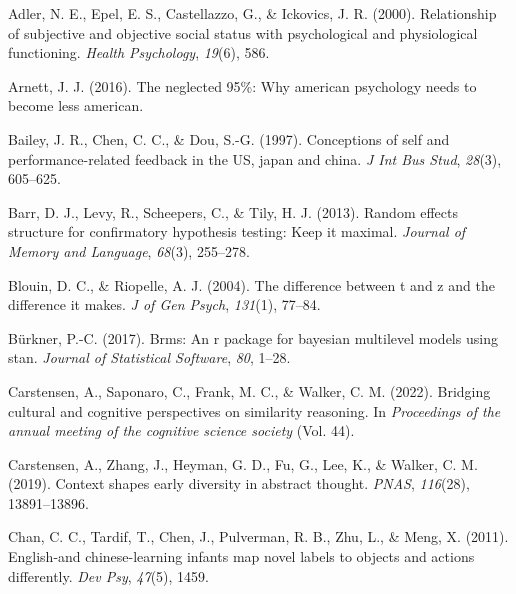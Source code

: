 \documentclass[
  man]{apa6}
\newlength{\cslhangindent}
\newlength{\cslentryspacingunit} %
\newenvironment{CSLReferences}[2] %
 {%
  \setlength{\parindent}{0pt}
  \ifodd #1
  \let\oldpar\par
  \def\par{\hangindent=\cslhangindent\oldpar}
  \fi
  \setlength{\parskip}{#2\cslentryspacingunit}
 }%
 {}
\begin{document}
\hypertarget{refs}{}
\begin{CSLReferences}{1}{0}
\leavevmode{}%
Adler, N. E., Epel, E. S., Castellazzo, G., \& Ickovics, J. R. (2000). Relationship of subjective and objective social status with psychological and physiological functioning. \emph{Health Psychology}, \emph{19}(6), 586.

\leavevmode{}%
Arnett, J. J. (2016). The neglected 95\%: Why american psychology needs to become less american.

\leavevmode{}%
Bailey, J. R., Chen, C. C., \& Dou, S.-G. (1997). Conceptions of self and performance-related feedback in the US, japan and china. \emph{J Int Bus Stud}, \emph{28}(3), 605--625.

\leavevmode{}%
Barr, D. J., Levy, R., Scheepers, C., \& Tily, H. J. (2013). Random effects structure for confirmatory hypothesis testing: Keep it maximal. \emph{Journal of Memory and Language}, \emph{68}(3), 255--278.

\leavevmode{}%
Blouin, D. C., \& Riopelle, A. J. (2004). The difference between t and z and the difference it makes. \emph{J of Gen Psych}, \emph{131}(1), 77--84.

\leavevmode{}%
Bürkner, P.-C. (2017). Brms: An r package for bayesian multilevel models using stan. \emph{Journal of Statistical Software}, \emph{80}, 1--28.

\leavevmode{}%
Carstensen, A., Saponaro, C., Frank, M. C., \& Walker, C. M. (2022). Bridging cultural and cognitive perspectives on similarity reasoning. In \emph{Proceedings of the annual meeting of the cognitive science society} (Vol. 44).

\leavevmode{}%
Carstensen, A., Zhang, J., Heyman, G. D., Fu, G., Lee, K., \& Walker, C. M. (2019). Context shapes early diversity in abstract thought. \emph{PNAS}, \emph{116}(28), 13891--13896.

\leavevmode{}%
Chan, C. C., Tardif, T., Chen, J., Pulverman, R. B., Zhu, L., \& Meng, X. (2011). English-and chinese-learning infants map novel labels to objects and actions differently. \emph{Dev Psy}, \emph{47}(5), 1459.


\end{CSLReferences}
\end{document}
